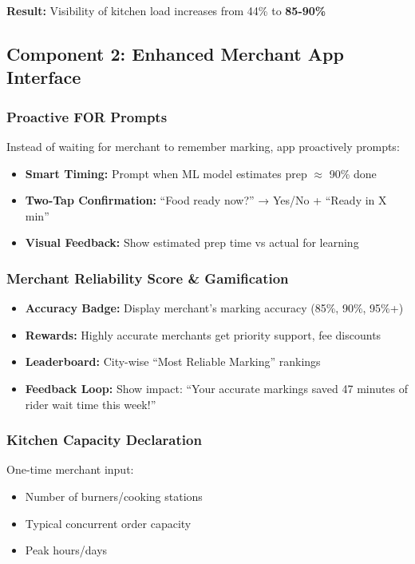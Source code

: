 \documentclass[11pt,a4paper]{article}
\begin{document}
\textbf{Result:} Visibility of kitchen load increases from 44\% to \textbf{85-90\%}

\subsection{Component 2: Enhanced Merchant App Interface}

\subsubsection{Proactive FOR Prompts}

Instead of waiting for merchant to remember marking, app proactively prompts:

\begin{itemize}[leftmargin=*]
    \item \textbf{Smart Timing:} Prompt when ML model estimates prep $\approx$ 90\% done
    \item \textbf{Two-Tap Confirmation:} ``Food ready now?'' → Yes/No + ``Ready in X min''
    \item \textbf{Visual Feedback:} Show estimated prep time vs actual for learning
\end{itemize}

\subsubsection{Merchant Reliability Score \& Gamification}

\begin{itemize}[leftmargin=*]
    \item \textbf{Accuracy Badge:} Display merchant's marking accuracy (85\%, 90\%, 95\%+)
    \item \textbf{Rewards:} Highly accurate merchants get priority support, fee discounts
    \item \textbf{Leaderboard:} City-wise ``Most Reliable Marking'' rankings
    \item \textbf{Feedback Loop:} Show impact: ``Your accurate markings saved 47 minutes of rider wait time this week!''
\end{itemize}

\subsubsection{Kitchen Capacity Declaration}

One-time merchant input:
\begin{itemize}
    \item Number of burners/cooking stations
    \item Typical concurrent order capacity
    \item Peak hours/days
\end{itemize}
\end{document}
